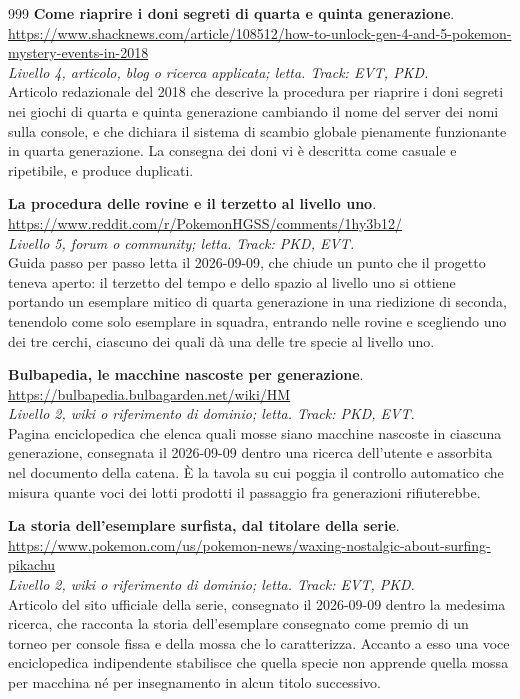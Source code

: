 \begin{thebibliography}{999}
  \textbf{Come riaprire i doni segreti di quarta e quinta generazione}.
  \\ \url{https://www.shacknews.com/article/108512/how-to-unlock-gen-4-and-5-pokemon-mystery-events-in-2018}
  \\ \emph{Livello 4, articolo, blog o ricerca applicata; letta. Track: EVT, PKD.}
  \\ Articolo redazionale del 2018 che descrive la procedura per riaprire i doni segreti nei giochi di quarta e quinta generazione cambiando il nome del server dei nomi sulla console, e che dichiara il sistema di scambio globale pienamente funzionante in quarta generazione. La consegna dei doni vi è descritta come casuale e ripetibile, e produce duplicati.

  \textbf{La procedura delle rovine e il terzetto al livello uno}.
  \\ \url{https://www.reddit.com/r/PokemonHGSS/comments/1hy3b12/}
  \\ \emph{Livello 5, forum o community; letta. Track: PKD, EVT.}
  \\ Guida passo per passo letta il 2026-09-09, che chiude un punto che il progetto teneva aperto: il terzetto del tempo e dello spazio al livello uno si ottiene portando un esemplare mitico di quarta generazione in una riedizione di seconda, tenendolo come solo esemplare in squadra, entrando nelle rovine e scegliendo uno dei tre cerchi, ciascuno dei quali dà una delle tre specie al livello uno.

  \textbf{Bulbapedia, le macchine nascoste per generazione}.
  \\ \url{https://bulbapedia.bulbagarden.net/wiki/HM}
  \\ \emph{Livello 2, wiki o riferimento di dominio; letta. Track: PKD, EVT.}
  \\ Pagina enciclopedica che elenca quali mosse siano macchine nascoste in ciascuna generazione, consegnata il 2026-09-09 dentro una ricerca dell'utente e assorbita nel documento della catena. È la tavola su cui poggia il controllo automatico che misura quante voci dei lotti prodotti il passaggio fra generazioni rifiuterebbe.

  \textbf{La storia dell'esemplare surfista, dal titolare della serie}.
  \\ \url{https://www.pokemon.com/us/pokemon-news/waxing-nostalgic-about-surfing-pikachu}
  \\ \emph{Livello 2, wiki o riferimento di dominio; letta. Track: EVT, PKD.}
  \\ Articolo del sito ufficiale della serie, consegnato il 2026-09-09 dentro la medesima ricerca, che racconta la storia dell'esemplare consegnato come premio di un torneo per console fissa e della mossa che lo caratterizza. Accanto a esso una voce enciclopedica indipendente stabilisce che quella specie non apprende quella mossa per macchina né per insegnamento in alcun titolo successivo.


\end{thebibliography}
